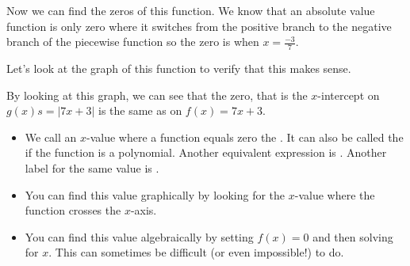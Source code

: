 \documentclass[nooutcomes]{ximera}
\begin{document}
\begin{example}
\begin{explanation}
Now we can find the zeros of this function.  We know that an absolute value function is only zero where it switches from the positive branch to the negative branch of the piecewise function so the zero is when $x=\tfrac{-3}{7}$.  

Let's look at the graph of this function to verify that this makes sense.

\begin{image}
\end{image}
\end{explanation}

By looking at this graph, we can see that the zero, that is the $x$-intercept on $g(x)s=|7x+3|$ is the same as on $f(x)=7x+3$.
\end{example}


\begin{summary}\begin{itemize}
\item We call an $x$-value where a function equals zero the .  It can also be called the  if the function is a polynomial. Another equivalent expression is .  Another label for the same value is .
\item You can find this value graphically by looking for the $x$-value where the function crosses the $x$-axis.
\item You can find this value algebraically by setting $f(x)=0$ and then solving for $x$.  This can sometimes be difficult (or even impossible!) to do.  
\end{itemize}\end{summary}
\end{document}
